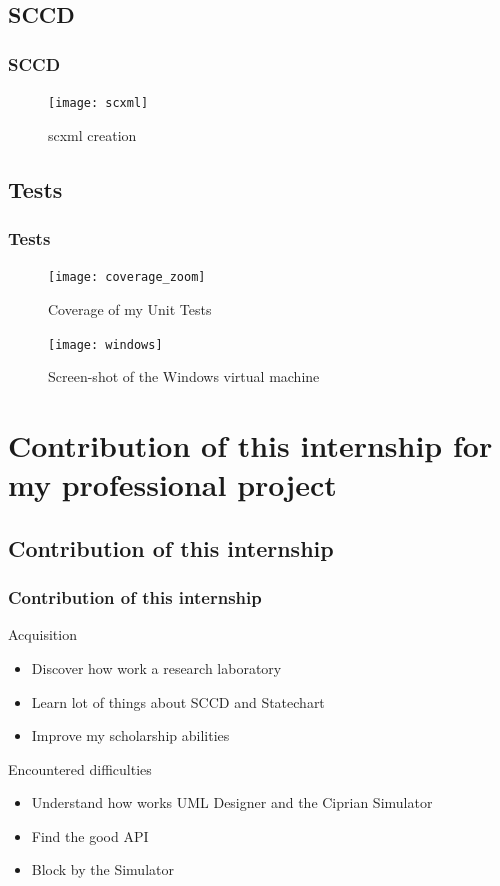 \documentclass[10pt, svgnames, compress, red]{beamer}
\begin{document}
\subsection{SCCD}
\begin{frame}
  \frametitle{SCCD}
  \begin{figure}[h]
    \centering
    \texttt{[image: scxml]}
    \caption{scxml creation}
  \end{figure}
  \transdissolve[duration=0.1]
\end{frame}

\subsection{Tests}
\begin{frame}
  \frametitle{Tests}
  \begin{figure}[h]
    \begin{minipage}[h]{0.45\linewidth}
      \texttt{[image: coverage\_zoom]}
      \caption{Coverage of my Unit Tests}
    \end{minipage}
    \hfill
    \begin{minipage}[h]{0.45\linewidth}
      \texttt{[image: windows]}
      \caption{Screen-shot of the Windows virtual machine}
    \end{minipage}
  \end{figure}

  \transdissolve[duration=0.1]
\end{frame}

\section[Contribution]{Contribution of this internship for my professional project}

\subsection{Contribution of this internship}
\begin{frame}
  \frametitle{Contribution of this internship}
  \begin{alertblock}{Acquisition}
    \begin{itemize}
    \item Discover how work a research laboratory
    \item Learn lot of things about SCCD and Statechart
    \item Improve my scholarship abilities
    \end{itemize}
  \end{alertblock}
  \begin{alertblock}{Encountered difficulties}
    \begin{itemize}
    \item Understand how works UML Designer and the Ciprian Simulator
    \item Find the good API
    \item Block by the Simulator
    \end{itemize}
  \end{alertblock}
  \transdissolve[duration=0.1]
\end{frame}
\end{document}
